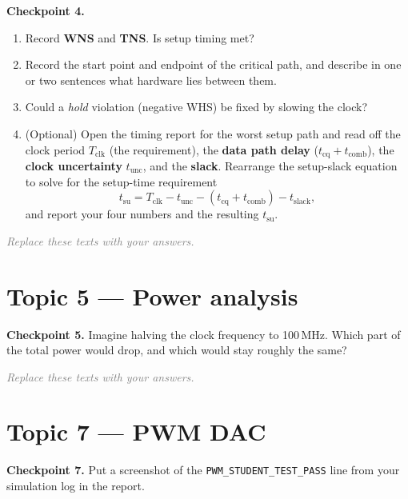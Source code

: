 \documentclass[11pt]{article}
\newcommand{\answerbox}[2]{%
  \begin{tcolorbox}[colback=ansbg,colframe=tudelft,boxrule=0.8pt,title={#1},
                    fonttitle=\bfseries\small]#2\end{tcolorbox}}
\begin{document}
\noindent\textbf{Checkpoint 4.}
\begin{enumerate}[noitemsep]
  \item Record \textbf{WNS} and \textbf{TNS}. Is setup timing met?
  \item Record the start point and endpoint of the critical path, and describe in one or two sentences what
        hardware lies between them.
  \item Could a \emph{hold} violation (negative WHS) be fixed by slowing the clock?
  \item (Optional) Open the timing report for the worst setup path and read off the clock period
        $T_{\mathrm{clk}}$ (the requirement), the \textbf{data path delay} ($t_{\mathrm{cq}} +
        t_{\mathrm{comb}}$), the \textbf{clock uncertainty} $t_{\mathrm{unc}}$, and the \textbf{slack}.
        Rearrange the setup-slack equation to solve for the setup-time requirement
        \[ t_{\mathrm{su}} = T_{\mathrm{clk}} - t_{\mathrm{unc}} - (t_{\mathrm{cq}} + t_{\mathrm{comb}})
           - t_{\mathrm{slack}}, \]
        and report your four numbers and the resulting $t_{\mathrm{su}}$.
\end{enumerate}
\answerbox{Your answer}{\textcolor{gray}{\textit{Replace these texts with your answers.}}\par\rule{0pt}{0.22\textheight}}

\section*{Topic 5 --- Power analysis}

\noindent\textbf{Checkpoint 5.} Imagine halving the clock frequency to 100\,MHz. Which part of the total
power would drop, and which would stay roughly the same?
\answerbox{Your answer}{\textcolor{gray}{\textit{Replace these texts with your answers.}}\par\rule{0pt}{0.12\textheight}}

\section*{Topic 7 --- PWM DAC}

\noindent\textbf{Checkpoint 7.} Put a screenshot of the \texttt{PWM\_STUDENT\_TEST\_PASS} line from your
simulation log in the report.
\begin{tcolorbox}[colback=white,colframe=tudelft,boxrule=0.8pt,
      title={\textbf{Paste your \texttt{PWM\_STUDENT\_TEST\_PASS} screenshot here}},
      fonttitle=\small,height=0.18\textheight]\mbox{}\end{tcolorbox}
\end{document}
